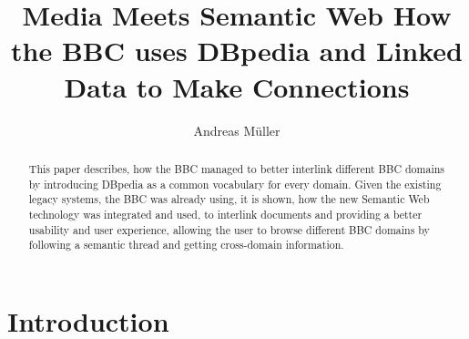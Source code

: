\documentclass{llncs}
\begin{document}
%
\frontmatter          %
%
\pagestyle{headings}  %
%
\mainmatter              %
%
\title{Media Meets Semantic Web \newline How the BBC uses DBpedia and Linked Data \newline to Make Connections}
%
%
\author{Andreas M\"{u}ller}
%
%
%

\maketitle              %

\begin{abstract} %
This paper describes, how the BBC managed to better interlink different BBC domains by introducing DBpedia as a common vocabulary for every domain. Given the existing legacy systems, the BBC was already using, it is shown, how the new Semantic Web technology was integrated and used, to interlink documents and providing a better usability and user experience, allowing the user to browse different BBC domains by following a semantic thread and getting cross-domain information.
\end{abstract}

\section{Introduction}
\end{document}
